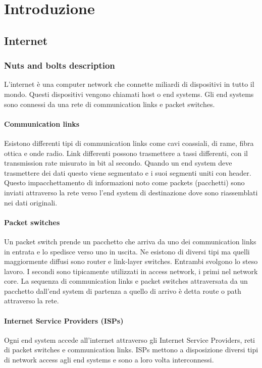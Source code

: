 \chapter{Introduzione}
\section{Internet}
\subsection{Nuts and bolts description}
L'internet \`e una computer network che connette miliardi di dispositivi in tutto il mondo. Questi dispositivi vengono chiamati host o end systems. Gli end systems sono connessi da una rete di communication
links e packet switches.
\subsubsection{Communication links}
 Esistono differenti tipi di communication links come cavi coassiali, di rame, fibra ottica e onde radio. Link differenti possono trasmettere a tassi differenti, con il transmission rate misurato
in bit al secondo. Quando un end system deve trasmettere dei dati questo viene segmentato e  i suoi segmenti uniti con header. Questo impacchettamento di informazioni noto come packets (pacchetti) sono 
inviati attraverso la rete verso l'end system di destinazione dove sono riassemblati nei dati originali. 
\subsubsection{Packet switches}
Un packet switch prende un pacchetto che arriva da uno dei communication links in entrata e lo spedisce verso uno in uscita. Ne esistono di diversi tipi ma quelli maggiormente diffusi sono router e link-layer
switches. Entrambi svolgono lo steso lavoro. I secondi sono tipicamente utilizzati in access network, i primi nel network core. La sequenza di communication links e packet switches attraversata da un pacchetto
dall'end system di partenza a quello di arrivo \`e detta route o path attraverso la rete. 
\subsubsection{Internet Service Providers (ISPs)}
Ogni end system accede all'internet attraverso gli Internet Service Providers, reti di packet switches e communication links. ISPs mettono a disposizione diversi tipi di network access agli end systems e sono a 
loro volta interconnessi. 
